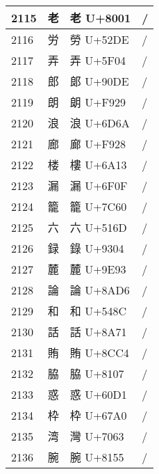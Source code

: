 \documentclass[uplatex,12pt]{jsarticle}
\begin{document}
\begin{longtable}[c]{llp{3cm}l}
  2115 & {\huge 老} &
    {\huge 老} U+8001 &
      /  \\ \hline
  2116 & {\huge 労} &
    {\huge 勞} U+52DE &
      /  \\ \hline
  2117 & {\huge 弄} &
    {\huge 弄} U+5F04 &
      /  \\ \hline
  2118 & {\huge 郎} &
    {\huge 郞} U+90DE &
      /  \\ \hline
  2119 & {\huge 朗} &
    {\huge 朗} U+F929 &
      /  \\ \hline
  2120 & {\huge 浪} &
    {\huge 浪} U+6D6A &
      /  \\ \hline
  2121 & {\huge 廊} &
    {\huge 廊} U+F928 &
      /  \\ \hline
  2122 & {\huge 楼} &
    {\huge 樓} U+6A13 &
      /  \\ \hline
  2123 & {\huge 漏} &
    {\huge 漏} U+6F0F &
      /  \\ \hline
  2124 & {\huge 籠} &
    {\huge 籠} U+7C60 &
      /  \\ \hline
  2125 & {\huge 六} &
    {\huge 六} U+516D &
      /  \\ \hline
  2126 & {\huge 録} &
    {\huge 錄} U+9304 &
      /  \\ \hline
  2127 & {\huge 麓} &
    {\huge 麓} U+9E93 &
      /  \\ \hline
  2128 & {\huge 論} &
    {\huge 論} U+8AD6 &
      /  \\ \hline
  2129 & {\huge 和} &
    {\huge 和} U+548C &
      /  \\ \hline
  2130 & {\huge 話} &
    {\huge 話} U+8A71 &
      /  \\ \hline
  2131 & {\huge 賄} &
    {\huge 賄} U+8CC4 &
      /  \\ \hline
  2132 & {\huge 脇} &
    {\huge 脇} U+8107 &
      /  \\ \hline
  2133 & {\huge 惑} &
    {\huge 惑} U+60D1 &
      /  \\ \hline
  2134 & {\huge 枠} &
    {\huge 枠} U+67A0 &
      /  \\ \hline
  2135 & {\huge 湾} &
    {\huge 灣} U+7063 &
      /  \\ \hline
  2136 & {\huge 腕} &
    {\huge 腕} U+8155 &
      /  \\ \hline
\end{longtable}
\end{document}
